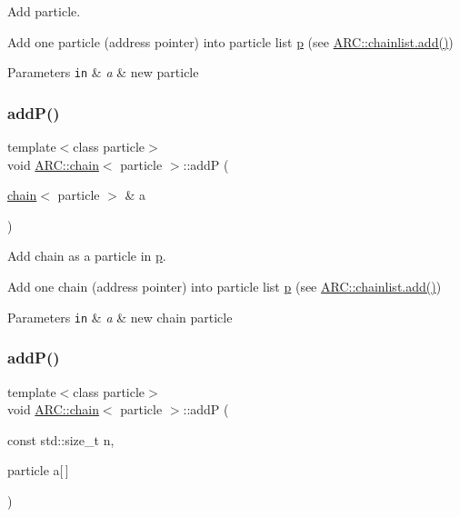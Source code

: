 Add particle. 

Add one particle (address pointer) into particle list \hyperlink{classARC_1_1chain_af1793b656e139e1f87c2e0a55f87514b}{p} (see \hyperlink{classARC_1_1chainlist_afa780edfa301cc22cf189e63d7a59c2c}{A\+R\+C\+::chainlist.\+add()}) 
\begin{DoxyParams}[1]{Parameters}
\mbox{\tt in}  & {\em a} & new particle \\
\hline
\end{DoxyParams}
\hypertarget{classARC_1_1chain_a22a0c3e8b42954edee0d2f66a27e8640}{}\label{classARC_1_1chain_a22a0c3e8b42954edee0d2f66a27e8640} 
\subsubsection{\texorpdfstring{add\+P()}{addP()}\hspace{0.1cm}{\footnotesize\ttfamily [2/3]}}
{\footnotesize\ttfamily template$<$class particle$>$ \\
void \hyperlink{classARC_1_1chain}{A\+R\+C\+::chain}$<$ particle $>$\+::addP (\begin{DoxyParamCaption}\item[{\hyperlink{classARC_1_1chain}{chain}$<$ particle $>$ \&}]{a }\end{DoxyParamCaption})\hspace{0.3cm}{\ttfamily [inline]}}



Add chain as a particle in \hyperlink{classARC_1_1chain_af1793b656e139e1f87c2e0a55f87514b}{p}. 

Add one chain (address pointer) into particle list \hyperlink{classARC_1_1chain_af1793b656e139e1f87c2e0a55f87514b}{p} (see \hyperlink{classARC_1_1chainlist_afa780edfa301cc22cf189e63d7a59c2c}{A\+R\+C\+::chainlist.\+add()}) 
\begin{DoxyParams}[1]{Parameters}
\mbox{\tt in}  & {\em a} & new chain particle \\
\hline
\end{DoxyParams}
\hypertarget{classARC_1_1chain_a658a7b777ac45e7900990dcc6ef0b752}{}\label{classARC_1_1chain_a658a7b777ac45e7900990dcc6ef0b752} 
\subsubsection{\texorpdfstring{add\+P()}{addP()}\hspace{0.1cm}{\footnotesize\ttfamily [3/3]}}
{\footnotesize\ttfamily template$<$class particle$>$ \\
void \hyperlink{classARC_1_1chain}{A\+R\+C\+::chain}$<$ particle $>$\+::addP (\begin{DoxyParamCaption}\item[{const std\+::size\+\_\+t}]{n,  }\item[{particle}]{a\mbox{[}$\,$\mbox{]} }\end{DoxyParamCaption})\hspace{0.3cm}{\ttfamily [inline]}}



